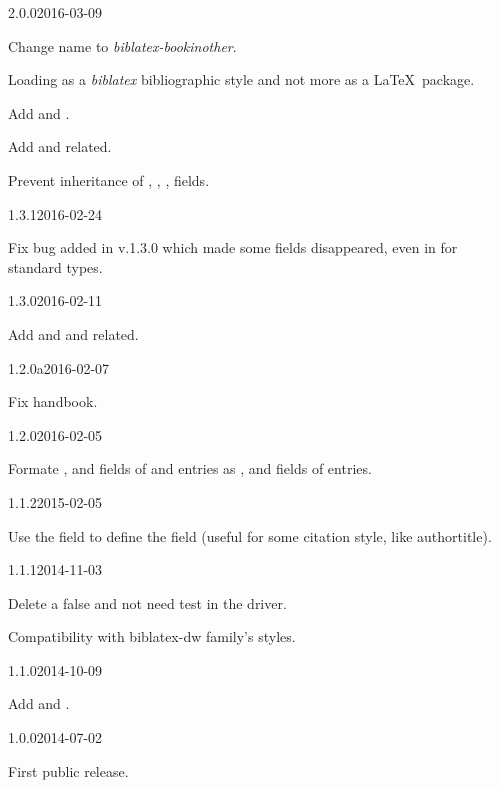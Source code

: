 \documentclass{ltxdockit}[2011/03/25]
\newcommand{\biblatex}{\emph{biblatex}\xspace}
\begin{document}
\begin{changelog}

\begin{release}{2.0.0}{2016-03-09}
\item Change name to \emph{biblatex-bookinother}.
\item Loading as a \biblatex bibliographic style and not more as a \LaTeX\ package.
\item Add  and .
\item Add  and related.
\item Prevent inheritance of , , ,  fields.
\end{release}

\begin{release}{1.3.1}{2016-02-24}
\item Fix bug added in v.1.3.0 which made some fields disappeared, even in for standard types.
\end{release}

\begin{release}{1.3.0}{2016-02-11}
\item Add  and  and related.
\end{release}

\begin{release}{1.2.0a}{2016-02-07}
\item Fix handbook.
\end{release}

\begin{release}{1.2.0}{2016-02-05}
\item Formate   ,  and  fields of   and  entries as ,  and  fields of  entries.
\end{release}

\begin{release}{1.1.2}{2015-02-05}
\item Use the  field to define the  field (useful for some citation style, like authortitle).
\end{release}

\begin{release}{1.1.1}{2014-11-03}
\item Delete a false and not need test in the driver.
\item Compatibility with biblatex-dw family's styles.
\end{release}
\begin{release}{1.1.0}{2014-10-09}
\item Add  and .
\end{release}

\begin{release}{1.0.0}{2014-07-02}
\item First public release.
\end{release}
\end{changelog}
\end{document}
